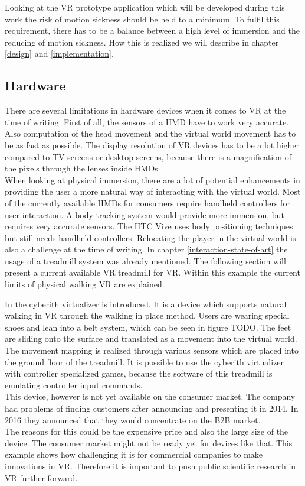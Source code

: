 Looking at the VR prototype application which will be developed during this work the risk of motion sickness should be held to a minimum. To fulfil this requirement, there has to be a balance between a high level of immersion and the reducing of motion sickness. How this is realized we will describe in chapter \ref{design} and \ref{implementation}.

\subsection{Hardware}
There are several limitations in hardware devices when it comes to VR at the time of writing. First of all, the sensors of a HMD have to work very accurate. Also computation of the head movement and the virtual world movement has to be as fast as possible. The display resolution of VR devices has to be a lot higher compared to TV screens or desktop screens, because there is a magnification of the pixels through the lenses inside HMDs \\
When looking at physical immersion, there are a lot of potential enhancements in providing the user a more natural way of interacting with the virtual world. Most of the currently available HMDs for consumers require handheld controllers for user interaction. A body tracking system would provide more immersion, but requires very accurate sensors. The HTC Vive uses body positioning techniques but still needs handheld controllers.
Relocating the player in the virtual world is also a challenge at the time of writing. In chapter \ref{interaction-state-of-art} the usage of a treadmill system was already mentioned. The following section will present a current available VR treadmill for VR. Within this example the current limits of physical walking VR are explained.

In \cite{Cakmak.2014} the cyberith virtualizer is introduced. It is a device which supports natural walking in VR through the walking in place method. Users are wearing special shoes and lean into a belt system, which can be seen in figure TODO. The feet are sliding onto the surface and translated as a movement into the virtual world. The movement mapping is realized through various sensors which are placed into the ground floor of the treadmill. It is possible to use the cyberith virtualizer with controller specialized games, because the software of this treadmill is emulating controller input commands.\\
This device, however is not yet available on the consumer market. The company had problems of finding customers after announcing and presenting it in 2014. In 2016 they announced that they would concentrate on the B2B market. \cite{Skarredghost.2019}\\
The reasons for this could be the expensive price and also the large size of the device. The consumer market might not be ready yet for devices like that. This example shows how challenging it is for commercial companies to make innovations in VR. Therefore it is important to push public scientific research in VR further forward.

